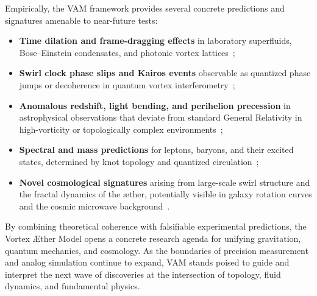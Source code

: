 Empirically, the VAM framework provides several concrete predictions and signatures amenable to near-future tests:
\begin{itemize}
    \item \textbf{Time dilation and frame-dragging effects} in laboratory superfluids, Bose–Einstein condensates, and photonic vortex lattices~\cite{VAM-2, VAM-13};
    \item \textbf{Swirl clock phase slips and Kairos events} observable as quantized phase jumps or decoherence in quantum vortex interferometry~\cite{VAM-15};
    \item \textbf{Anomalous redshift, light bending, and perihelion precession} in astrophysical observations that deviate from standard General Relativity in high-vorticity or topologically complex environments~\cite{VAM-10};
    \item \textbf{Spectral and mass predictions} for leptons, baryons, and their excited states, determined by knot topology and quantized circulation~\cite{VAM-11, VAM-14};
    \item \textbf{Novel cosmological signatures} arising from large-scale swirl structure and the fractal dynamics of the æther, potentially visible in galaxy rotation curves and the cosmic microwave background~\cite{VAM-9, VAM-12}.
\end{itemize}

By combining theoretical coherence with falsifiable experimental predictions, the Vortex Æther Model opens a concrete research agenda for unifying gravitation, quantum mechanics, and cosmology. As the boundaries of precision measurement and analog simulation continue to expand, VAM stands poised to guide and interpret the next wave of discoveries at the intersection of topology, fluid dynamics, and fundamental physics.